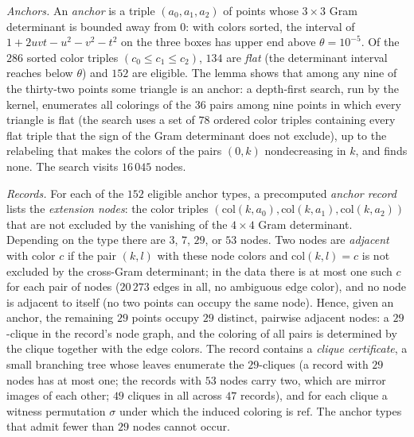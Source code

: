 \documentclass[11pt]{amsart}
\theoremstyle{definition}
\theoremstyle{remark}
\begin{document}
\emph{Anchors.} An \emph{anchor} is a triple $(a_0,a_1,a_2)$ of points whose $3\times3$ Gram determinant is bounded away from $0$: with colors sorted, the interval of $1+2uvt-u^{2}-v^{2}-t^{2}$ on the three boxes has upper end above $\theta=10^{-5}$. Of the $286$ sorted color triples $(c_0\le c_1\le c_2)$, $134$ are \emph{flat} (the determinant interval reaches below $\theta$) and $152$ are eligible. The lemma  shows that among any nine of the thirty-two points some triangle is an anchor: a depth-first search, run by the kernel, enumerates all colorings of the $36$ pairs among nine points in which every triangle is flat (the search uses a set of $78$ ordered color triples containing every flat triple that the sign of the Gram determinant does not exclude), up to the relabeling that makes the colors of the pairs $(0,k)$ nondecreasing in $k$, and finds none. The search visits $16\,045$ nodes.

{\sloppy\emph{Records.} For each of the $152$ eligible anchor types, a precomputed \emph{anchor record} lists the \emph{extension nodes}: the color triples $(\mathrm{col}(k,a_0),\mathrm{col}(k,a_1),\mathrm{col}(k,a_2))$ that are not excluded by the vanishing of the $4\times4$ Gram determinant. Depending on the type there are $3$, $7$, $29$, or $53$ nodes. Two nodes are \emph{adjacent} with color $c$ if the pair $(k,l)$ with these node colors and $\mathrm{col}(k,l)=c$ is not excluded by the cross-Gram determinant; in the data there is at most one such $c$ for each pair of nodes ($20\,273$ edges in all, no ambiguous edge color), and no node is adjacent to itself (no two points can occupy the same node). Hence, given an anchor, the remaining $29$ points occupy $29$ distinct, pairwise adjacent nodes: a $29$-clique in the record's node graph, and the coloring of all pairs is determined by the clique together with the edge colors. The record contains a \emph{clique certificate}, a small branching tree whose leaves enumerate the $29$-cliques (a record with $29$ nodes has at most one; the records with $53$ nodes carry two, which are mirror images of each other; $49$ cliques in all across $47$ records), and for each clique a witness permutation $\sigma$ under which the induced coloring is $\mathrm{ref}$. The anchor types that admit fewer than $29$ nodes cannot occur.\par}
\end{document}
